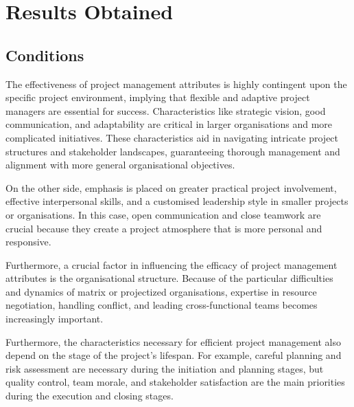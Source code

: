 \documentclass{article}
\begin{document}
\section{Results Obtained}
\subsection{Conditions}


The effectiveness of project management attributes is highly contingent upon the specific project environment, implying that flexible and adaptive project managers are essential for success. Characteristics like strategic vision, good communication, and adaptability are critical in larger organisations and more complicated initiatives. These characteristics aid in navigating intricate project structures and stakeholder landscapes, guaranteeing thorough management and alignment with more general organisational objectives.

On the other side, emphasis is placed on greater practical project involvement, effective interpersonal skills, and a customised leadership style in smaller projects or organisations. In this case, open communication and close teamwork are crucial because they create a project atmosphere that is more personal and responsive.

Furthermore, a crucial factor in influencing the efficacy of project management attributes is the organisational structure. Because of the particular difficulties and dynamics of matrix or projectized organisations, expertise in resource negotiation, handling conflict, and leading cross-functional teams becomes increasingly important.

Furthermore, the characteristics necessary for efficient project management also depend on the stage of the project's lifespan. For example, careful planning and risk assessment are necessary during the initiation and planning stages, but quality control, team morale, and stakeholder satisfaction are the main priorities during the execution and closing stages.
\end{document}
